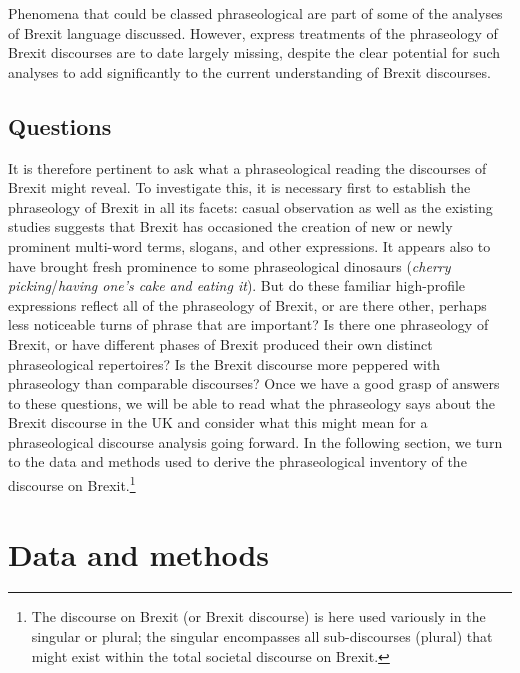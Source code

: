 \documentclass[output=paper]{langscibook}
\begin{document}
Phenomena that could be classed phraseological are part of some of the analyses of Brexit language discussed. However, express treatments of the phraseology of Brexit discourses are to date largely missing, despite the clear potential for such analyses to add significantly to the current understanding of Brexit discourses.

\subsection{Questions}

It is therefore pertinent to ask what a phraseological reading the discourses of Brexit might reveal. To investigate this, it is necessary first to establish the phraseology of Brexit in all its facets: casual observation as well as the existing studies suggests that Brexit has occasioned the creation of new or newly prominent multi-word terms, slogans, and other expressions. It appears also to have brought fresh prominence to some phraseological dinosaurs (\textit{cherry picking}\slash\textit{having one’s cake and eating it}). But do these familiar high-profile expressions reflect all of the phraseology of Brexit, or are there other, perhaps less noticeable turns of phrase that are important? Is there one phraseology of Brexit, or have different phases of Brexit produced their own distinct phraseological repertoires? Is the Brexit discourse more peppered with phraseology than comparable discourses? Once we have a good grasp of answers to these questions, we will be able to read what the phraseology says about the Brexit discourse in the UK and consider what this might mean for a phraseological discourse analysis going forward. In the following section, we turn to the data and methods used to derive the phraseological inventory of the discourse on Brexit.\footnote{The discourse on Brexit (or Brexit discourse) is here used variously in the singular or plural; the singular encompasses all sub-discourses (plural) that might exist within the total societal discourse on Brexit.}

\section{Data and methods}
\end{document}
